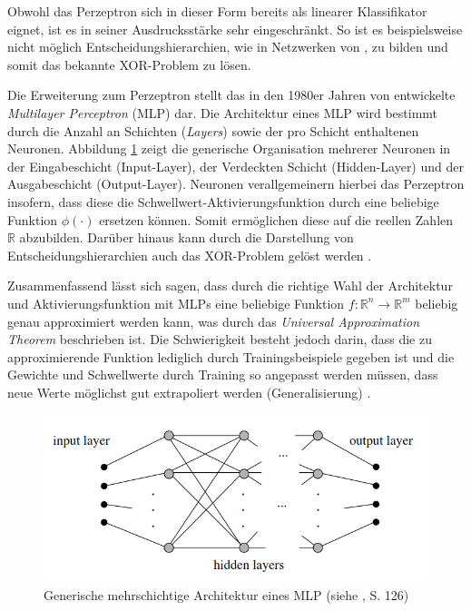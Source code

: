 Obwohl das Perzeptron sich in dieser Form bereits als linearer Klassifikator eignet, ist es in seiner Ausdrucksstärke sehr eingeschränkt. So ist es beispielsweise nicht möglich Entscheidungshierarchien, wie in Netzwerken von \cite{McCulloch1943}, zu bilden und somit das bekannte XOR-Problem zu lösen.

Die Erweiterung zum Perzeptron stellt das in den 1980er Jahren von \cite{Rumelhart1986b} entwickelte \textit{Multilayer Perceptron} (MLP) dar. Die Architektur eines MLP wird bestimmt durch die Anzahl an Schichten (\textit{Layers}) sowie der pro Schicht enthaltenen Neuronen. Abbildung \ref{fig:2_mlp} zeigt die generische Organisation mehrerer Neuronen in der Eingabeschicht (Input-Layer), der Verdeckten Schicht (Hidden-Layer) und der Ausgabeschicht (Output-Layer). Neuronen verallgemeinern hierbei das Perzeptron insofern, dass diese die Schwellwert-Aktivierungsfunktion durch eine beliebige Funktion $\phi(\cdot)$ ersetzen können. Somit ermöglichen diese auf die reellen Zahlen $\mathbb{R}$ abzubilden. Darüber hinaus kann durch die Darstellung von Entscheidungshierarchien auch das XOR-Problem gelöst werden \cite[vgl.][S. 125]{Rojas1996}. 

Zusammenfassend lässt sich sagen, dass  durch die richtige Wahl der Architektur und Aktivierungsfunktion mit MLPs eine beliebige Funktion $f:\mathbb{R}^n \rightarrow \mathbb{R}^m $ beliebig genau approximiert werden kann, was durch das \textit{Universal Approximation Theorem} beschrieben ist. Die Schwierigkeit besteht jedoch darin, dass die zu approximierende Funktion lediglich durch Trainingsbeispiele gegeben ist und die Gewichte und Schwellwerte durch Training so angepasst werden müssen, dass neue Werte möglichst gut extrapoliert werden (Generalisierung) \cite[vgl.][S. 24 ff.]{Rojas1996}. 

 \begin{figure}[H]
 \centering
 \includegraphics[width=0.8\linewidth]{images/2_mlp}
 \caption[Generische mehrschichtige Architektur eines MLP]{Generische mehrschichtige Architektur eines MLP (siehe \cite{Rojas1996}, S. 126)}
 \label{fig:2_mlp}
 \end{figure}

